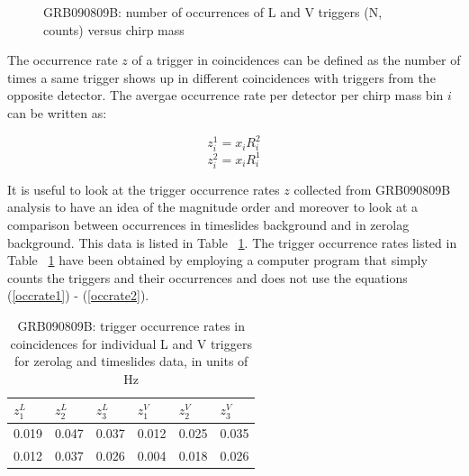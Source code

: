 \documentclass[epsf]{article}
\begin{document}
\begin{figure}[ht!]
\begin{minipage}[b]{0.7\linewidth}
\end{minipage}
\caption{GRB090809B: number of occurrences of L and V triggers (N, counts) versus chirp mass}
\label{occurrencefigures}
\end{figure}

The occurrence rate $z$ of a trigger in coincidences can be defined as the number of times a same trigger shows up in different coincidences with triggers from the opposite detector. The avergae occurrence rate per detector per chirp mass bin $i$ can be written as:

\begin{equation}
\label{occrate1}
z^1_i = x_i R^2_i
\end{equation}
\begin{equation}
\label{occrate2}
z^2_i = x_i R^1_i
\end{equation}

It is useful to look at the trigger occurrence rates $z$ collected from GRB090809B analysis to have an idea of the magnitude order and moreover to look at a comparison between occurrences in timeslides background and in zerolag background. This data is listed in Table ~\ref{occurrences}. The trigger occurrence rates listed in Table ~\ref{occurrences} have been obtained by employing a computer program that simply counts the triggers and their occurrences and does not use the equations (\ref{occrate1}) - (\ref{occrate2}). 

\begin{table}[ht!]
 \begin{tabular}{|l|l|l|l|l|l|}
 \hline
 \hline
 $z_{1}^L$ & $z_{2}^L$ & $z_{3}^L$ & $z_{1}^V$ & $z_{2}^V$ & $z_{3}^V$  \\
 \hline
 0.019 & 0.047 & 0.037 & 0.012 & 0.025 & 0.035 \\
 \hline
 0.012 & 0.037 & 0.026 & 0.004 & 0.018 & 0.026 \\
 \hline
 \hline
 \end{tabular} 
 \caption{GRB090809B: trigger occurrence rates in coincidences for individual L and V triggers for zerolag and timeslides data, in units of Hz}
 \label{occurrences}
\end{table}
\end{document}
